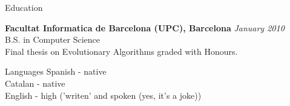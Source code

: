 \documentclass{resume} %
\begin{document}

\begin{rSection}{Education}

{\bf Facultat Informatica de Barcelona (UPC), Barcelona} \hfill {\em January 2010} \\
B.S. in Computer Science \\
Final thesis on Evolutionary Algorithms graded with Honours. \smallskip \\
\end{rSection}

\begin{rSection}{Languages}
Spanish - native\\
Catalan - native\\
English - high ('writen' and spoken (yes, it's a joke))\\
\end{rSection}
\end{document}
